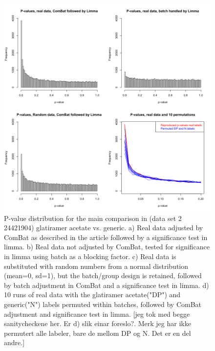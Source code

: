 \documentclass{bio}
\newcommand\NOTE[1]{{\color{red}[#1]}}
\begin{document}
\begin{figure}[!p]
\centering\includegraphics[width=13cm]{Fig/pvaluestowfic.png}
\caption{
P-value distribution for the main comparison in (data set 2 24421904) glatiramer acetate vs. generic.  
a) Real data adjusted by ComBat as described in the article followed by a significance test in limma. 
b) Real data not adjusted by ComBat, tested for significance in limma using batch as a blocking factor. 
c) Real data is substituted with random numbers from a normal distribution (mean=0, sd=1), but the batch/group design is retained, followed by batch adjustment in ComBat and a significance test in limma.
d) 10 runs of real data with the glatiramer acetate("DP") and generic("N") labels permuted within batches, followed by ComBat adjustment and significance test in limma.  
\NOTE{jeg tok med begge sanitycheckene her. Er d) slik einar foreslo?. Merk jeg har ikke permutert alle labeler, bare de mellom DP og N. Det er en del andre.}
}
\label{p-towfic}
\end{figure}
\end{document}
